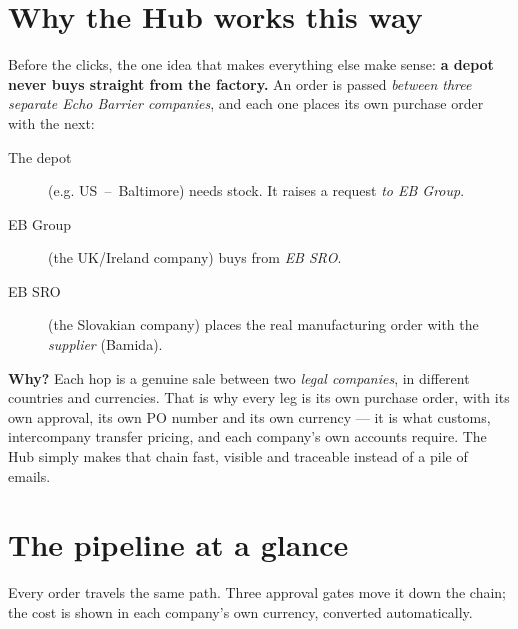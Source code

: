 \documentclass[11pt]{article}
\newcommand{\whybox}[1]{\par\vspace{3pt}\noindent\colorbox{ebtint}{\parbox{\dimexpr\linewidth-2\fboxsep}%
  {\vspace{3pt}\hspace{2pt}\textbf{\color{ebgreen}Why?} #1\hspace{2pt}\vspace{3pt}}}\par\vspace{3pt}}
\begin{document}
\tableofcontents
\thispagestyle{fancy}

\section{Why the Hub works this way}
Before the clicks, the one idea that makes everything else make sense: \textbf{a
depot never buys straight from the factory.} An order is passed \emph{between three
separate Echo Barrier companies}, and each one places its own purchase order with
the next:

\begin{description}
  \item[The depot] (e.g. US~--~Baltimore) needs stock. It raises a request \emph{to
    EB Group}.
  \item[EB Group] (the UK/Ireland company) buys from \emph{EB SRO}.
  \item[EB SRO] (the Slovakian company) places the real manufacturing order with the
    \emph{supplier} (Bamida).
\end{description}

\whybox{Each hop is a genuine sale between two \emph{legal companies}, in different
countries and currencies. That is why every leg is its own purchase order, with its
own approval, its own PO number and its own currency --- it is what customs,
inter\-company transfer pricing, and each company's own accounts require. The Hub
simply makes that chain fast, visible and traceable instead of a pile of emails.}

\section{The pipeline at a glance}
Every order travels the same path. Three approval gates move it down the chain; the
cost is shown in each company's own currency, converted automatically.
\end{document}
